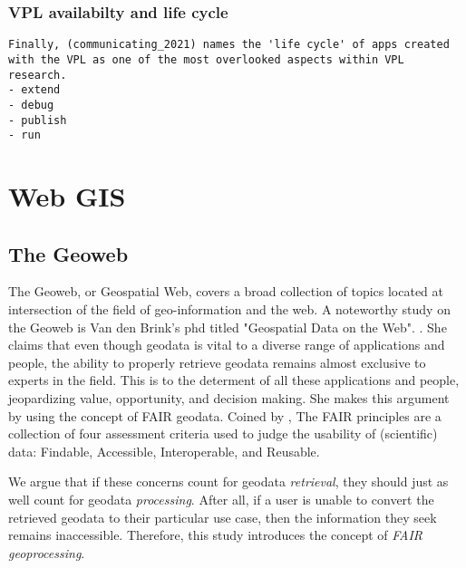 \subsubsection{VPL availabilty and life cycle}
\begin{lstlisting}
Finally, (communicating_2021) names the 'life cycle' of apps created 
with the VPL as one of the most overlooked aspects within VPL research. 
- extend 
- debug
- publish
- run
\end{lstlisting}



\section{Web GIS}


\subsection{The Geoweb}
\label{sec:geoweb}


The Geoweb, or Geospatial Web, covers a broad collection of topics located at intersection of the field of geo-information and the web. A noteworthy study on the Geoweb is Van den Brink's phd titled "Geospatial Data on the Web". \cite{brink_geospatial_2018}. She claims that even though geodata is vital to a diverse range of applications and people, the ability to properly retrieve geodata remains almost exclusive to experts in the field. This is to the determent of all these applications and people, jeopardizing value, opportunity, and decision making. She makes this argument by using the concept of FAIR geodata. Coined by \cite{mark_d_wilkinson_fair_2016}, The FAIR principles are a collection of four assessment criteria used to judge the usability of (scientific) data: Findable, Accessible, Interoperable, and Reusable. 

We argue that if these concerns count for geodata \textit{retrieval}, they should just as well count for geodata \textit{processing}. After all, if a user is unable to convert the retrieved geodata to their particular use case, then the information they seek remains inaccessible. Therefore, this study introduces the concept of \emph{FAIR geoprocessing}. 

